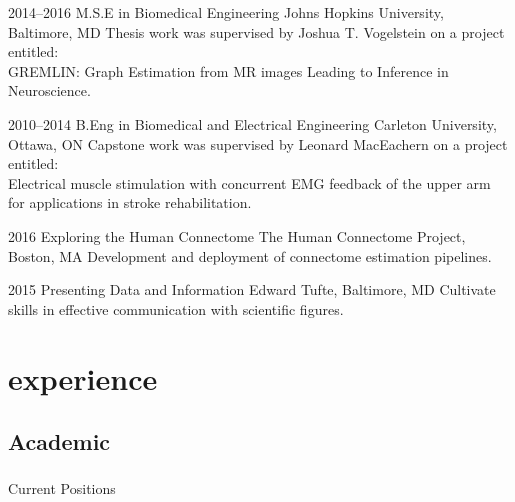 \documentclass[]{friggeri-cv} %
\begin{document}
\begin{entrylist}


\entry
{2014--2016}
{M.S.E {\normalfont in Biomedical Engineering}}
{Johns Hopkins University, Baltimore, MD}
{Thesis work was supervised by Joshua T. Vogelstein on a project entitled:\\GREMLIN: Graph Estimation from MR images Leading to Inference in Neuroscience.}


\entry
{2010--2014}
{B.Eng {\normalfont in Biomedical and Electrical Engineering}}
{Carleton University, Ottawa, ON}
{Capstone work was supervised by Leonard MacEachern on a project entitled:\\Electrical muscle stimulation with concurrent EMG feedback of the upper arm for applications in stroke rehabilitation.}


\entry
{2016}
{Exploring the Human Connectome}
{The Human Connectome Project, Boston, MA}
{Development and deployment of connectome estimation pipelines.}


\entry
{2015}
{Presenting Data and Information}
{Edward Tufte, Baltimore, MD}
{Cultivate skills in effective communication with scientific figures.}

\end{entrylist}


\section{experience}

\subsection{Academic}

\subsubsection{}{Current Positions}
\end{document}
